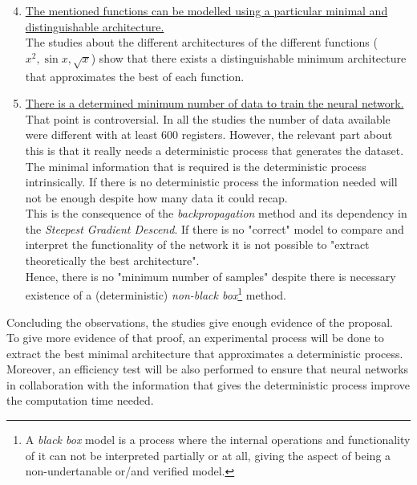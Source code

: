 \documentclass[a4paper, 11pt]{article}
\begin{document}
\begin{enumerate}
    \setcounter{enumi}{3}
    \item \underline{The mentioned functions can be modelled using a particular minimal and}\\
    \underline{distinguishable architecture.}\vspace{0.5em}\\
 The studies about the different architectures of the different functions ($x^2, \sin{x}, \sqrt{x}$) show that there exists a distinguishable minimum architecture that approximates the best of each function.\\
    \item \underline{There is a determined minimum number of data to train the neural network.}\vspace{0.5em}\\
 That point is controversial. In all the studies the number of data available were different with at least $600$ registers. However, the relevant part about this is that it really needs a deterministic process that generates the dataset.\\
 The minimal information that is required is the deterministic process intrinsically. If there is no deterministic process the information needed will not be enough despite how many data it could recap.\\
 This is the consequence of the \textit{backpropagation} method and its dependency in the \textit{Steepest Gradient Descend}. If there is no "correct" model to compare and interpret the functionality of the network it is not possible to "extract theoretically the best architecture".\\
 Hence, there is no "minimum number of samples" despite there is necessary existence of a (deterministic) \textit{non-black box}\footnote{A \textit{black box} model is a process where the internal operations and functionality of it can not be interpreted partially or at all, giving the aspect of being a non-undertanable or/and verified model.} method.
\end{enumerate}
Concluding the observations, the studies give enough evidence of the proposal.\\
To give more evidence of that proof, an experimental process will be done to extract the best minimal architecture that approximates a deterministic process.\\
Moreover, an efficiency test will be also performed to ensure that neural networks in collaboration with the information that gives the deterministic process improve the computation time needed.
\end{document}
